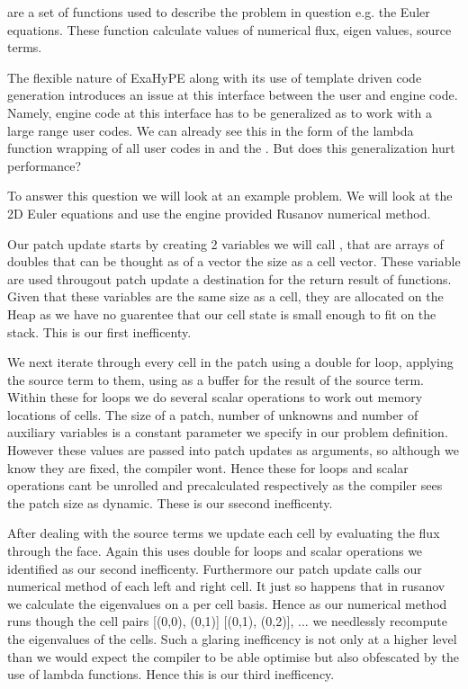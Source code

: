  are a set of functions used to describe the problem in question e.g. the Euler equations.
These function calculate values of numerical flux, eigen values, source terms.

The flexible nature of ExaHyPE along with its use of template driven code generation introduces an issue at this interface between the user and engine code.
Namely, engine code at this interface has to be generalized as to work with a large range user codes.
We can already see this in the form of the lambda function wrapping of all user codes in  and the .
But does this generalization hurt performance?

To answer this question we will look at an example problem.
We will look at the 2D Euler equations and use the engine provided Rusanov numerical method.



Our patch update starts by creating 2 variables we will call ,  that are arrays of doubles that can be thought as of a vector the size as a cell vector.
These variable are used througout patch update a destination for the return result of functions.
Given that these variables are the same size as a cell, they are allocated on the Heap as we have no guarentee that our cell state is small enough to fit on the stack.
This is our first inefficenty.

We next iterate through every cell in the patch using a double for loop, applying the source term to them, using  as a buffer for the result of the source term.
Within these for loops we do several scalar operations to work out memory locations of cells.
The size of a patch, number of unknowns and number of auxiliary variables is a constant parameter we specify in our problem definition.
However these values are passed into patch updates as arguments, so although we know they are fixed, the compiler wont. %
Hence these for loops and scalar operations cant be unrolled and precalculated respectively as the compiler sees the patch size as dynamic.
These is our ssecond inefficenty.

After dealing with the source terms we update each cell by evaluating the flux through the face.
Again this uses double for loops and scalar operations we identified as our second inefficenty.
Furthermore our patch update calls our numerical method of each left and right cell.
It just so happens that in rusanov we calculate the eigenvalues on a per cell basis.
Hence as our numerical method runs though the cell pairs [(0,0), (0,1)] [(0,1), (0,2)], ... we needlessly recompute the eigenvalues of the cells.
Such a glaring inefficency is not only at a higher level than we would expect the compiler to be able optimise but also obfescated by the use of lambda functions.
Hence this is our third inefficency.


